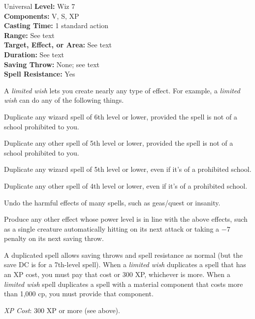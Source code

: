 {Universal}
{
	\textbf{Level:}
	Wiz 7\\
	\textbf{Components:}
	V, S, XP\\
	\textbf{Casting Time:}
	1 standard action\\
	\textbf{Range:}
	See text\\
	\textbf{Target, Effect, or Area:}
	See text\\
	\textbf{Duration:}
	See text\\
	\textbf{Saving Throw:}
	None; see text\\
	\textbf{Spell Resistance:}
	Yes\\
}
{
	A \emph{limited wish} lets you create nearly any type of effect. For example, a \emph{limited wish} can do any of the following things.

	\begin{itemize*}
	\item Duplicate any wizard spell of 6th level or lower, provided the spell is not of a school prohibited to you.
	\item Duplicate any other spell of 5th level or lower, provided the spell is not of a school prohibited to you.
	\item Duplicate any wizard spell of 5th level or lower, even if it's of a prohibited school.
	\item Duplicate any other spell of 4th level or lower, even if it's of a prohibited school.
	\item Undo the harmful effects of many spells, such as geas/quest or insanity.
	\item Produce any other effect whose power level is in line with the above effects, such as a single creature automatically hitting on its next attack or taking a $-7$ penalty on its next saving throw.
	\end{itemize*}

	A duplicated spell allows saving throws and spell resistance as normal (but the save DC is for a 7th-level spell). When a \emph{limited wish} duplicates a spell that has an XP cost, you must pay that cost or 300 XP, whichever is more. When a \emph{limited wish} spell duplicates a spell with a material component that costs more than 1,000 cp, you must provide that component.

	\textit{XP Cost}:
	300 XP or more (see above).

}
